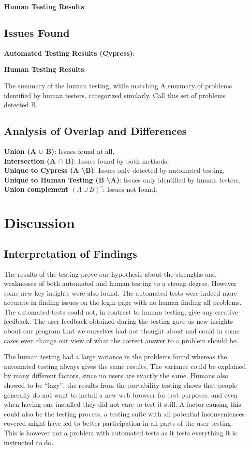 \documentclass[journal,twocolumn]{IEEEtran}
\begin{document}
\textbf{Human Testing Results}:
\subsection{Issues Found}
\textbf{Automated Testing Results (Cypress)}:

\textbf{Human Testing Results}:

The summary of the human testing, while matching
A summary of problems identified by human testers, categorized similarly. Call this set of problems detected B.

\subsection{Analysis of Overlap and Differences}
\textbf{Union (A $\cup$ B)}: Issues found at all. \\
\textbf{Intersection (A $\cap$ B)}: Issues found by both methods. \\
\textbf{Unique to Cypress (A \textbackslash B)}: Issues only detected by automated testing. \\
\textbf{Unique to Human Testing (B \textbackslash A)}: Issues only identified by human testers. \\
\textbf{Union complement $(A \cup B)^c$}: Issues not found.


\section{Discussion}
\subsection{Interpretation of Findings}

The results of the testing prove our hypothesis about the strengths and weaknesses of both automated and human testing to a strong degree. However some new key insights were also found. The automated tests were indeed more accurate in finding issues on the login page with no human finding all problems. The automated tests could not, in contrast to human testing, give any creative feedback. The user feedback obtained during the testing gave us new insights about our program that we ourselves had not thought about and could in some cases even change our view of what the correct answer to a problem should be.

The human testing had a large variance in the problems found whereas the automated testing always gives the same results. The variance could be explained by many different factors, since no users are exactly the same. Humans also showed to be “lazy”, the results from the portability testing shows that people generally do not want to install a new web browser for test purposes, and even when having one installed they did not care to test it still. A factor causing this could also be the testing process, a testing suite with all potential inconveniences covered might have led to better participation in all parts of the user testing. This is however not a problem with automated tests as it tests everything it is instructed to do.
\end{document}
